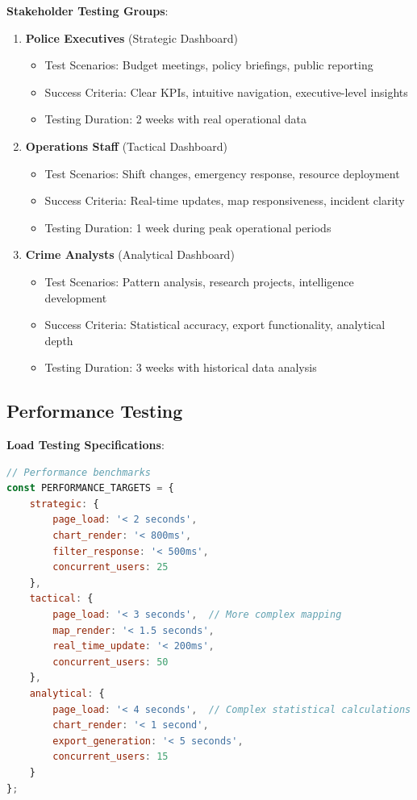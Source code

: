 \documentclass[12pt,a4paper]{article}
\begin{document}
\textbf{Stakeholder Testing Groups}:
\begin{enumerate}
    \item \textbf{Police Executives} (Strategic Dashboard)
    \begin{itemize}
        \item Test Scenarios: Budget meetings, policy briefings, public reporting
        \item Success Criteria: Clear KPIs, intuitive navigation, executive-level insights
        \item Testing Duration: 2 weeks with real operational data
    \end{itemize}
    
    \item \textbf{Operations Staff} (Tactical Dashboard)
    \begin{itemize}
        \item Test Scenarios: Shift changes, emergency response, resource deployment
        \item Success Criteria: Real-time updates, map responsiveness, incident clarity
        \item Testing Duration: 1 week during peak operational periods
    \end{itemize}
    
    \item \textbf{Crime Analysts} (Analytical Dashboard)
    \begin{itemize}
        \item Test Scenarios: Pattern analysis, research projects, intelligence development
        \item Success Criteria: Statistical accuracy, export functionality, analytical depth
        \item Testing Duration: 3 weeks with historical data analysis
    \end{itemize}
\end{enumerate}

\subsection{Performance Testing}

\textbf{Load Testing Specifications}:
\begin{lstlisting}[language=JavaScript]
// Performance benchmarks
const PERFORMANCE_TARGETS = {
    strategic: {
        page_load: '< 2 seconds',
        chart_render: '< 800ms',
        filter_response: '< 500ms',
        concurrent_users: 25
    },
    tactical: {
        page_load: '< 3 seconds',  // More complex mapping
        map_render: '< 1.5 seconds',
        real_time_update: '< 200ms',
        concurrent_users: 50
    },
    analytical: {
        page_load: '< 4 seconds',  // Complex statistical calculations
        chart_render: '< 1 second',
        export_generation: '< 5 seconds',
        concurrent_users: 15
    }
};
\end{lstlisting}
\end{document}
